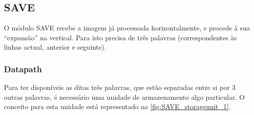\documentclass[a4paper]{article}
\begin{document}

\subsection{SAVE}

O módulo SAVE recebe a imagem já processada horizontalmente, e procede à sua ``expansão'' na vertical. Para isto precisa de três palavras (correspondentes às linhas actual, anterior e seguinte).

\subsubsection{Datapath}
\label{sssec:SAVE_Datapath}
Para ter disponíveis as ditas três palavras, que estão separadas entre si por 3 outras palavras, é necessário uma unidade de armazenamento algo particular. O conceito para esta unidade está representado na \autoref{fig:SAVE_storageunit_1}.
\end{document}
